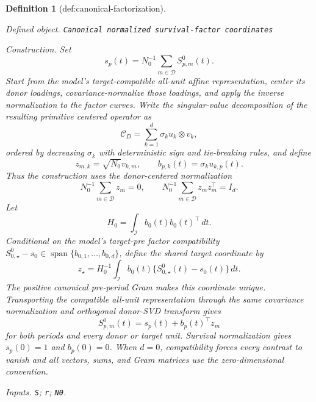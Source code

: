 \documentclass{article}
\newtheorem{definition}{Definition}
\begin{document}
\begin{definition}[def:canonical-factorization]\label{def:canonical-factorization}
\par\smallskip\noindent\emph{Defined object.} \texttt{Canonical normalized survival-\allowbreak{}factor coordinates}
\par\smallskip\noindent\emph{Construction.} Set
\[
 s_p(t)=N_0^{-1}\sum_{m\in\mathcal D}S^0_{p,m}(t).
\]
Start from the model's target-compatible all-unit affine representation, center its donor loadings, covariance-normalize those loadings, and apply the inverse normalization to the factor curves. Write the singular-value decomposition of the resulting primitive centered operator as
\[
 \mathcal C_D=\sum_{k=1}^d\sigma_k u_k\otimes v_k,
\]
ordered by decreasing \(\sigma_k\) with deterministic sign and tie-breaking rules, and define
\[
 z_{m,k}=\sqrt{N_0}v_{k,m},
 \qquad b_{p,k}(t)=\sigma_k u_{k,p}(t).
\]
Thus the construction uses the donor-centered normalization
\[
 N_0^{-1}\sum_{m\in\mathcal D}z_m=0,
 \qquad N_0^{-1}\sum_{m\in\mathcal D}z_mz_m^\top=I_d.
\]
Let
\[
 H_0=\int_{\mathcal I}b_0(t)b_0(t)^\top\,dt.
\]
Conditional on the model's target-pre factor compatibility
\(S^0_{0,\star}-s_0\in\operatorname{span}\{b_{0,1},\ldots,b_{0,d}\}\), define the shared target coordinate by
\[
 z_\star=H_0^{-1}\int_{\mathcal I}b_0(t)
 \{S^0_{0,\star}(t)-s_0(t)\}\,dt.
\]
The positive canonical pre-period Gram makes this coordinate unique. Transporting the compatible all-unit representation through the same covariance normalization and orthogonal donor-SVD transform gives
\[
 S^0_{p,m}(t)=s_p(t)+b_p(t)^\top z_m
\]
for both periods and every donor or target unit. Survival normalization gives \(s_p(0)=1\) and \(b_p(0)=0\). When \(d=0\), compatibility forces every contrast to vanish and all vectors, sums, and Gram matrices use the zero-dimensional convention.
\par\smallskip\noindent\emph{Inputs.} \texttt{S}; \texttt{r}; \texttt{N0}.
\end{definition}
\end{document}
